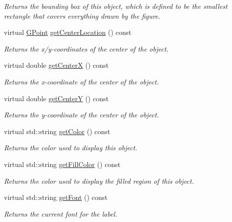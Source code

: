 \begin{DoxyCompactItemize}
\begin{DoxyCompactList}\small\item\em Returns the bounding box of this object, which is defined to be the smallest rectangle that covers everything drawn by the figure. \end{DoxyCompactList}\item 
virtual \mbox{\hyperlink{structsgl_1_1GPoint}{G\+Point}} \mbox{\hyperlink{classsgl_1_1GObject_a0909472e91448470bccdb62ecfb95d8b}{get\+Center\+Location}} () const
\begin{DoxyCompactList}\small\item\em Returns the x/y-\/coordinates of the center of the object. \end{DoxyCompactList}\item 
virtual double \mbox{\hyperlink{classsgl_1_1GObject_a04df74355b545e0543112d5b8d924176}{get\+CenterX}} () const
\begin{DoxyCompactList}\small\item\em Returns the {\itshape x}-\/coordinate of the center of the object. \end{DoxyCompactList}\item 
virtual double \mbox{\hyperlink{classsgl_1_1GObject_acb3287a3d507025a26f54b895713b947}{get\+CenterY}} () const
\begin{DoxyCompactList}\small\item\em Returns the {\itshape y}-\/coordinate of the center of the object. \end{DoxyCompactList}\item 
virtual std\+::string \mbox{\hyperlink{classsgl_1_1GObject_aa061dfa488c31e18549d64363c1d0e34}{get\+Color}} () const
\begin{DoxyCompactList}\small\item\em Returns the color used to display this object. \end{DoxyCompactList}\item 
virtual std\+::string \mbox{\hyperlink{classsgl_1_1GObject_a76f6964a11fde7c78e9751be184e1a3c}{get\+Fill\+Color}} () const
\begin{DoxyCompactList}\small\item\em Returns the color used to display the filled region of this object. \end{DoxyCompactList}\item 
virtual std\+::string \mbox{\hyperlink{classsgl_1_1GText_a894a5502900794eeb27d084c21f1d77d}{get\+Font}} () const
\begin{DoxyCompactList}\small\item\em Returns the current font for the label. \end{DoxyCompactList}\item 

\end{DoxyCompactItemize}

